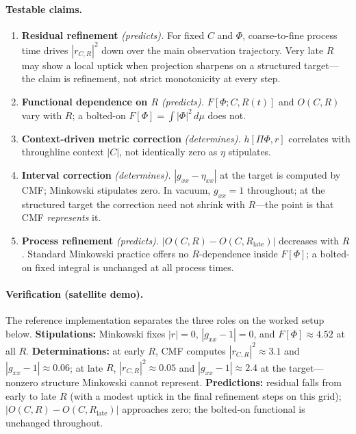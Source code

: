 \documentclass[11pt,a4paper]{article}
\newcommand{\Ph}{\Phi}
\begin{document}
\paragraph{Testable claims.}
\begin{enumerate}[label=\textbf{P\arabic*:},leftmargin=2em]
  \item \textbf{Residual refinement} \emph{(predicts).} For fixed $C$ and $\Ph$, coarse-to-fine process time drives $|r_{C,R}|^2$ down over the main observation trajectory. Very late $R$ may show a local uptick when projection sharpens on a structured target---the claim is refinement, not strict monotonicity at every step.
  \item \textbf{Functional dependence on $R$} \emph{(predicts).} $F[\Ph;C,R(t)]$ and $O(C,R)$ vary with $R$; a bolted-on $F[\Ph]=\int|\Ph|^2\,d\mu$ does not.
  \item \textbf{Context-driven metric correction} \emph{(determines).} $h[\Pi\Ph,r]$ correlates with throughline context $|C|$, not identically zero as $\eta$ stipulates.
  \item \textbf{Interval correction} \emph{(determines).} $|g_{xx}-\eta_{xx}|$ at the target is computed by CMF; Minkowski stipulates zero. In vacuum, $g_{xx}=1$ throughout; at the structured target the correction need not shrink with $R$---the point is that CMF \emph{represents} it.
  \item \textbf{Process refinement} \emph{(predicts).} $|O(C,R)-O(C,R_{\mathrm{late}})|$ decreases with $R$. Standard Minkowski practice offers no $R$-dependence inside $F[\Ph]$; a bolted-on fixed integral is unchanged at all process times.
\end{enumerate}

\paragraph{Verification (satellite demo).}
The reference implementation separates the three roles on the worked setup below. \textbf{Stipulations:} Minkowski fixes $|r|=0$, $|g_{xx}-1|=0$, and $F[\Ph]\approx 4.52$ at all $R$. \textbf{Determinations:} at early $R$, CMF computes $|r_{C,R}|^2 \approx 3.1$ and $|g_{xx}-1|\approx 0.06$; at late $R$, $|r_{C,R}|^2 \approx 0.05$ and $|g_{xx}-1|\approx 2.4$ at the target---nonzero structure Minkowski cannot represent. \textbf{Predictions:} residual falls from early to late $R$ (with a modest uptick in the final refinement steps on this grid); $|O(C,R)-O(C,R_{\mathrm{late}})|$ approaches zero; the bolted-on functional is unchanged throughout.
\end{document}
